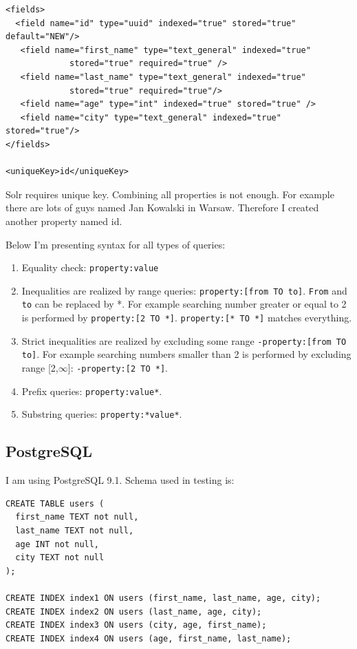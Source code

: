 \documentclass[10pt,a4paper]{article}
\begin{document}
\begin{verbatim}
<fields>
  <field name="id" type="uuid" indexed="true" stored="true" default="NEW"/>
   <field name="first_name" type="text_general" indexed="true"
             stored="true" required="true" /> 
   <field name="last_name" type="text_general" indexed="true" 
             stored="true" required="true"/>
   <field name="age" type="int" indexed="true" stored="true" /> 
   <field name="city" type="text_general" indexed="true" stored="true"/>
</fields>

<uniqueKey>id</uniqueKey> 
\end{verbatim}

Solr requires unique key. Combining all properties is not enough. For example there are lots of guys named Jan Kowalski in Warsaw. Therefore I created another property named id.

\bigskip
Below I'm presenting syntax for all types of queries:
\begin{enumerate}
\item Equality check: \verb|property:value|
\item Inequalities are realized by range queries: \verb|property:[from TO to]|. \verb|From| and \verb|to| can be replaced by *. For example searching number greater or equal to 2 is performed by \verb|property:[2 TO *]|. \verb|property:[* TO *]| matches everything.
\item Strict inequalities are realized by excluding some range \verb|-property:[from TO to]|. For example searching numbers smaller than 2 is performed by excluding range [2,$\infty$]: \verb|-property:[2 TO *]|.
\item Prefix queries: \verb|property:value*|.
\item Substring queries: \verb|property:*value*|.
 
\end{enumerate}

\subsection{PostgreSQL}

I am using PostgreSQL 9.1. Schema used in testing is:

\begin{verbatim}
CREATE TABLE users (
  first_name TEXT not null,
  last_name TEXT not null,
  age INT not null,
  city TEXT not null
);

CREATE INDEX index1 ON users (first_name, last_name, age, city);
CREATE INDEX index2 ON users (last_name, age, city);
CREATE INDEX index3 ON users (city, age, first_name);
CREATE INDEX index4 ON users (age, first_name, last_name);
\end{verbatim}
\end{document}
